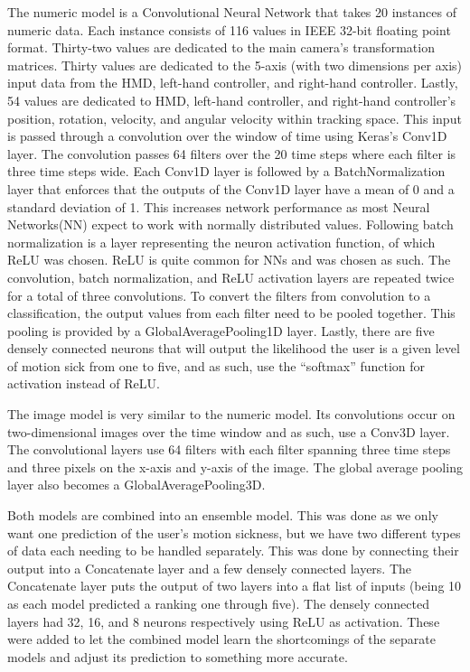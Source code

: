The numeric model is a Convolutional Neural Network that takes 20 instances of numeric data.
Each instance consists of 116 values in IEEE 32-bit floating point format.
Thirty-two values are dedicated to the main camera's transformation matrices.
Thirty values are dedicated to the 5-axis (with two dimensions per axis) input data from the HMD, left-hand controller, and right-hand controller.
Lastly, 54 values are dedicated to HMD, left-hand controller, and right-hand controller's position, rotation, velocity, and angular velocity within tracking space.
This input is passed through a convolution over the window of time using Keras's Conv1D layer.
The convolution passes 64 filters over the 20 time steps where each filter is three time steps wide.
Each Conv1D layer is followed by a BatchNormalization layer that enforces that the outputs of the Conv1D layer have a mean of 0 and a standard deviation of 1.
This increases network performance as most Neural Networks(NN) expect to work with normally distributed values.
Following batch normalization is a layer representing the neuron activation function, of which ReLU was chosen.
ReLU is quite common for NNs and was chosen as such.
The convolution, batch normalization, and ReLU activation layers are repeated twice for a total of three convolutions.
To convert the filters from convolution to a classification, the output values from each filter need to be pooled together.
This pooling is provided by a GlobalAveragePooling1D layer.
Lastly, there are five densely connected neurons that will output the likelihood the user is a given level of motion sick from one to five, and as such, use the ``softmax'' function for activation instead of ReLU\@.

The image model is very similar to the numeric model.
Its convolutions occur on two-dimensional images over the time window and as such, use a Conv3D layer.
The convolutional layers use 64 filters with each filter spanning three time steps and three pixels on the x-axis and y-axis of the image.
The global average pooling layer also becomes a GlobalAveragePooling3D\@.

Both models are combined into an ensemble model.
This was done as we only want one prediction of the user's motion sickness, but we have two different types of data each needing to be handled separately.
This was done by connecting their output into a Concatenate layer and a few densely connected layers.
The Concatenate layer puts the output of two layers into a flat list of inputs (being 10 as each model predicted a ranking one through five).
The densely connected layers had 32, 16, and 8 neurons respectively using ReLU as activation.
These were added to let the combined model learn the shortcomings of the separate models and adjust its prediction to something more accurate.

